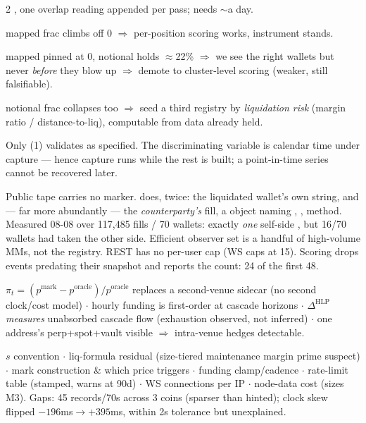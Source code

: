 \documentclass[10pt,a4paper]{article}
\begin{document}
\begin{multicols}{2}
, one overlap reading appended per pass; needs
$\sim$a day.
\begin{opnums}
\item mapped frac climbs off 0 $\Rightarrow$ per-position scoring works, instrument stands.
\item mapped pinned at 0, notional holds $\approx$22\% $\Rightarrow$ we see the right wallets but never
      \emph{before} they blow up $\Rightarrow$ demote to cluster-level scoring (weaker, still falsifiable).
\item notional frac collapses too $\Rightarrow$ seed a third registry by \emph{liquidation risk}
      (margin ratio / distance-to-liq), computable from data already held.
\end{opnums}
Only (1) validates as specified. The discriminating variable is calendar time under capture — hence
capture runs while the rest is built; a point-in-time series cannot be recovered later.

Public tape carries no marker.  does, twice: the liquidated wallet's own 
string, and — far more abundantly — the \emph{counterparty's} fill, a  object naming
, , method. Measured 08-08 over 117,485 fills / 70 wallets: exactly
\emph{one} self-side , but 16/70 wallets had taken the other side. Efficient observer set is a
handful of high-volume MMs, not the registry. REST has no per-user cap (WS caps at 15).
Scoring drops events predating their snapshot and reports the count: 24 of the first 48.

$\pi_t=(p^{\mathrm{mark}}-p^{\mathrm{oracle}})/p^{\mathrm{oracle}}$ replaces a second-venue sidecar (no
second clock/cost model) $\cdot$ hourly funding is first-order at cascade horizons $\cdot$
$\Delta^{\mathrm{HLP}}$ \emph{measures} unabsorbed cascade flow (exhaustion observed, not inferred)
$\cdot$ one address's perp+spot+vault visible $\Rightarrow$ intra-venue hedges detectable.

$s$ convention $\cdot$ liq-formula residual (size-tiered maintenance margin prime suspect) $\cdot$ mark
construction \& which price triggers $\cdot$ funding clamp/cadence $\cdot$ rate-limit table (stamped,
warns at 90d) $\cdot$ WS connections per IP $\cdot$ node-data cost (sizes M3).
Gaps:  45 records/70s across 3 coins (sparser than hinted); clock skew flipped
$-196$ms$\to+395$ms, within 2s tolerance but unexplained.


\end{multicols}
\end{document}

